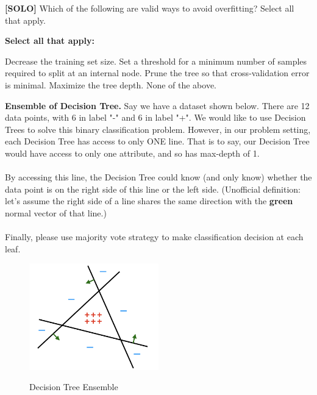 \documentclass[11pt,addpoints,answers]{exam}
\begin{document}
\begin{questions}
    
  
    
    
    
    \question[2] \textbf{[SOLO]} Which of the following are valid ways to avoid overfitting? Select all that apply.

    \textbf{Select all that apply:}
    {
    \checkboxchar{$\Box$} \checkedchar{$\blacksquare$}
    \begin{checkboxes}
        \choice Decrease the training set size. 
        \CorrectChoice Set a threshold for a minimum number of samples required to split at an internal node. 
        \CorrectChoice Prune the tree so that cross-validation error is minimal. 
        \choice Maximize the tree depth.
        \choice None of the above.
    \end{checkboxes}
    }

    
    \clearpage
    
    \question[3] \textbf{Ensemble of Decision Tree.} Say we have a dataset shown below. There are 12 data points, with 6 in label "-" and 6 in label "+". We would like to use Decision Trees to solve this binary classification problem. However, in our problem setting, each Decision Tree has access to only ONE line. That is to say, our Decision Tree would have access to only one attribute, and so has max-depth of 1. \\ \\
    By accessing this line, the Decision Tree could know (and only know) whether the data point is on the right side of this line or the left side. (Unofficial definition: let's assume the right side of a line shares the same direction with the \textcolor{OliveGreen}{\textbf{green}} normal vector of that line.) \\ \\
    Finally, please use majority vote strategy to make classification decision at each leaf.\\
    
    \begin{figure}[H]
        \centering
        \includegraphics[width = 0.5\textwidth]{images/ensemble_dt.png}
        \label{Q_ensemble_DT}
        \caption{Decision Tree Ensemble \label{fig:ensemble}}
    \end{figure}
    

\end{questions}
\end{document}
